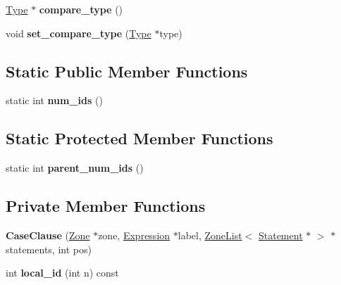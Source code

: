 \begin{DoxyCompactItemize}
\item 
\hyperlink{classv8_1_1internal_1_1_type}{Type} $\ast$ {\bfseries compare\+\_\+type} ()\hypertarget{classv8_1_1internal_1_1_case_clause_aa2fb3720c5370fd33899b5fe12f4e965}{}\label{classv8_1_1internal_1_1_case_clause_aa2fb3720c5370fd33899b5fe12f4e965}

\item 
void {\bfseries set\+\_\+compare\+\_\+type} (\hyperlink{classv8_1_1internal_1_1_type}{Type} $\ast$type)\hypertarget{classv8_1_1internal_1_1_case_clause_aa1ea720cf023ca6dccd09fdd97084fbf}{}\label{classv8_1_1internal_1_1_case_clause_aa1ea720cf023ca6dccd09fdd97084fbf}

\end{DoxyCompactItemize}
\subsection*{Static Public Member Functions}
\begin{DoxyCompactItemize}
\item 
static int {\bfseries num\+\_\+ids} ()\hypertarget{classv8_1_1internal_1_1_case_clause_a7078c629f3a74167b2c637bdc8ec8f2e}{}\label{classv8_1_1internal_1_1_case_clause_a7078c629f3a74167b2c637bdc8ec8f2e}

\end{DoxyCompactItemize}
\subsection*{Static Protected Member Functions}
\begin{DoxyCompactItemize}
\item 
static int {\bfseries parent\+\_\+num\+\_\+ids} ()\hypertarget{classv8_1_1internal_1_1_case_clause_ad8857ba0a591500ecc483aefb809e0e1}{}\label{classv8_1_1internal_1_1_case_clause_ad8857ba0a591500ecc483aefb809e0e1}

\end{DoxyCompactItemize}
\subsection*{Private Member Functions}
\begin{DoxyCompactItemize}
\item 
{\bfseries Case\+Clause} (\hyperlink{classv8_1_1internal_1_1_zone}{Zone} $\ast$zone, \hyperlink{classv8_1_1internal_1_1_expression}{Expression} $\ast$label, \hyperlink{classv8_1_1internal_1_1_zone_list}{Zone\+List}$<$ \hyperlink{classv8_1_1internal_1_1_statement}{Statement} $\ast$ $>$ $\ast$statements, int pos)\hypertarget{classv8_1_1internal_1_1_case_clause_a08498261bccc2f178d7747249942bff1}{}\label{classv8_1_1internal_1_1_case_clause_a08498261bccc2f178d7747249942bff1}

\item 
int {\bfseries local\+\_\+id} (int n) const \hypertarget{classv8_1_1internal_1_1_case_clause_ada27c18aa201f6ad6527201268852a2b}{}\label{classv8_1_1internal_1_1_case_clause_ada27c18aa201f6ad6527201268852a2b}

\end{DoxyCompactItemize}
